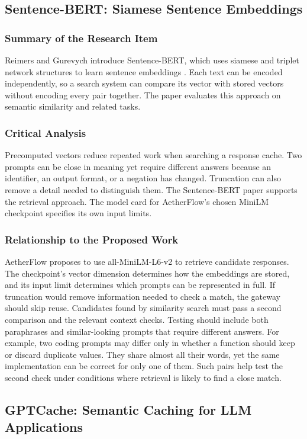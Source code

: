 \documentclass{FastFyp}
\begin{document}
\subsection{Sentence-BERT: Siamese Sentence Embeddings}
\subsubsection{Summary of the Research Item}
Reimers and Gurevych introduce Sentence-BERT, which uses siamese and triplet network structures to learn sentence embeddings \cite{ref:SBERT}. Each text can be encoded independently, so a search system can compare its vector with stored vectors without encoding every pair together. The paper evaluates this approach on semantic similarity and related tasks.

\subsubsection{Critical Analysis}
Precomputed vectors reduce repeated work when searching a response cache. Two prompts can be close in meaning yet require different answers because an identifier, an output format, or a negation has changed. Truncation can also remove a detail needed to distinguish them. The Sentence-BERT paper supports the retrieval approach. The model card for AetherFlow's chosen MiniLM checkpoint specifies its own input limits.

\subsubsection{Relationship to the Proposed Work}
AetherFlow proposes to use all-MiniLM-L6-v2 to retrieve candidate responses. The checkpoint's vector dimension determines how the embeddings are stored, and its input limit determines which prompts can be represented in full. If truncation would remove information needed to check a match, the gateway should skip reuse. Candidates found by similarity search must pass a second comparison and the relevant context checks. Testing should include both paraphrases and similar-looking prompts that require different answers. For example, two coding prompts may differ only in whether a function should keep or discard duplicate values. They share almost all their words, yet the same implementation can be correct for only one of them. Such pairs help test the second check under conditions where retrieval is likely to find a close match.

\subsection{GPTCache: Semantic Caching for LLM Applications}
\end{document}
